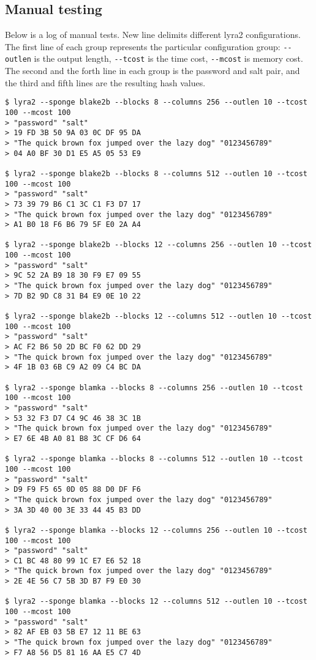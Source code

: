 \subsection{Manual testing}

Below is a log of manual tests. New line delimits different lyra2 configurations. The first line of each group represents the particular configuration group: \verb|--outlen| is the output length, \verb|--tcost| is the time cost, \verb|--mcost| is memory cost. The second and the forth line in each group is the password and salt pair, and the third and fifth lines are the resulting hash values.

\tiny
\begin{verbatim}
$ lyra2 --sponge blake2b --blocks 8 --columns 256 --outlen 10 --tcost 100 --mcost 100
> "password" "salt"
> 19 FD 3B 50 9A 03 0C DF 95 DA
> "The quick brown fox jumped over the lazy dog" "0123456789"
> 04 A0 BF 30 D1 E5 A5 05 53 E9

$ lyra2 --sponge blake2b --blocks 8 --columns 512 --outlen 10 --tcost 100 --mcost 100
> "password" "salt"
> 73 39 79 B6 C1 3C C1 F3 D7 17
> "The quick brown fox jumped over the lazy dog" "0123456789"
> A1 B0 18 F6 B6 79 5F E0 2A A4

$ lyra2 --sponge blake2b --blocks 12 --columns 256 --outlen 10 --tcost 100 --mcost 100
> "password" "salt"
> 9C 52 2A B9 18 30 F9 E7 09 55
> "The quick brown fox jumped over the lazy dog" "0123456789"
> 7D B2 9D C8 31 B4 E9 0E 10 22

$ lyra2 --sponge blake2b --blocks 12 --columns 512 --outlen 10 --tcost 100 --mcost 100
> "password" "salt"
> AC F2 B6 50 2D BC F0 62 DD 29
> "The quick brown fox jumped over the lazy dog" "0123456789"
> 4F 1B 03 6B C9 A2 09 C4 BC DA

$ lyra2 --sponge blamka --blocks 8 --columns 256 --outlen 10 --tcost 100 --mcost 100
> "password" "salt"
> 53 32 F3 D7 C4 9C 46 38 3C 1B
> "The quick brown fox jumped over the lazy dog" "0123456789"
> E7 6E 4B A0 81 B8 3C CF D6 64

$ lyra2 --sponge blamka --blocks 8 --columns 512 --outlen 10 --tcost 100 --mcost 100
> "password" "salt"
> D9 F9 F5 65 0D 05 88 D0 DF F6
> "The quick brown fox jumped over the lazy dog" "0123456789"
> 3A 3D 40 00 3E 33 44 45 B3 DD

$ lyra2 --sponge blamka --blocks 12 --columns 256 --outlen 10 --tcost 100 --mcost 100
> "password" "salt"
> C1 BC 48 80 99 1C E7 E6 52 18
> "The quick brown fox jumped over the lazy dog" "0123456789"
> 2E 4E 56 C7 5B 3D B7 F9 E0 30

$ lyra2 --sponge blamka --blocks 12 --columns 512 --outlen 10 --tcost 100 --mcost 100
> "password" "salt"
> 82 AF EB 03 5B E7 12 11 BE 63
> "The quick brown fox jumped over the lazy dog" "0123456789"
> F7 A8 56 D5 81 16 AA E5 C7 4D
\end{verbatim}
\normalsize


